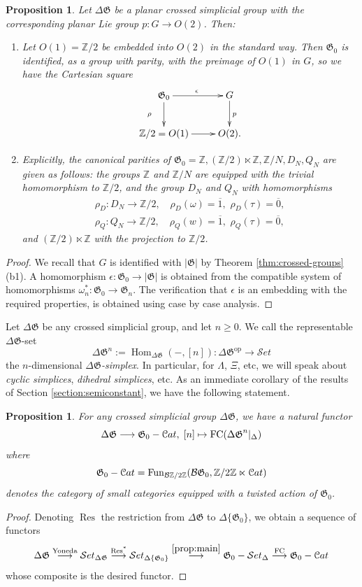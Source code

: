 \documentclass[english,11pt,leqno]{article}
\def\ZZ{\mathbb{Z}}
\def\Gen{\mathfrak{G}}
\def\Hom{\operatorname{Hom}}
\def\on{\operatorname}
\def\lra{\longrightarrow}
\def\op{{\operatorname{op}}}
\def\Fun{\operatorname{Fun}}
\def\Hom{\operatorname{Hom}}
\def\Cat{{\mathcal Cat}}
\def\Set{ {\mathcal Set}}
\def\FC{\operatorname{FC}}
\def\B{ {\EuScript B}}
\def\Set{ {\mathcal Set}}
\def\FC{\on{FC}}
\def\Zt{\mathbb{Z}/2\mathbb{Z}}
\def\BZt{{\mathcal B}\mathbb{Z}/2\mathbb{Z}}
\def\B{{\mathcal B}}
\def\Cat{{\EuScript Cat}}
\def\DG{ {\Delta \Gen}}
\newtheorem{prop}[thm]{Proposition}
\theoremstyle{definition}
\theoremstyle{remark}
\numberwithin{equation}{section}
\begin{document}
\begin{prop}\label{prop:orient-G-0}
Let $\DG$ be a planar crossed simplicial group with the corresponding planar Lie group $p: G \to O(2)$. Then:
\begin{enumerate}
\item[(a)] Let $O(1)=\ZZ/2$ be embedded into $O(2)$ in the standard way. Then $\Gen_0$ is identified,
as a group with parity, with the preimage of $O(1)$ in $G$, so we have the Cartesian square
\[
\xymatrix{
\Gen_0\ar[r]^\epsilon \ar[d]^{\hskip -.7cm \rho} & G\ar[d]^p\\
\ZZ/2=O(1) \ar[r]& O(2). 
}
\]
\item[(b)] Explicitly, the canonical parities of $\Gen_0 = \ZZ, (\ZZ/2)\ltimes \ZZ, \ZZ/N, D_N, Q_N$
are given as follows:  
 the groups  $\ZZ$ and $\ZZ/N$  are equipped with the trivial homomorphism to
 $\ZZ/2$, and the group  $D_N$ and $Q_N$ with homomorphisms
\[
 \begin{gathered}
   \rho_D: D_N\lra  \ZZ/2, \quad \rho_D(\omega)=\overline 1, \,\,\rho_D(\tau)=\overline 0, 
 \\
 \rho_Q: Q_N\lra  \ZZ/2, \quad \rho_Q(w)=\overline 1, \,\,\rho_Q(\tau)=\overline 0,
 \end{gathered}
 \]
 and $(\ZZ/2)\ltimes\ZZ$ with the projection to $\ZZ/2$. 
\end{enumerate}
\end{prop}
\begin{proof}We recall that $G$ is identified with $|\Gen|$ by Theorem 
\ref{thm:crossed-groups}(b1). A homomorphism $\epsilon: \Gen_0\to |\Gen|$
is obtained from the compatible system of homomorphisms $\omega_n^*: \Gen_0\to \Gen_n$. 
The verification that $\epsilon$ is an embedding with the required properties, is obtained using case
by case analysis.
\end{proof}

Let $\DG$ be any crossed simplicial group, and let $n\geq 0$. We call the representable $\DG$-set
\[
\DG^n := \Hom_\DG(-, [n]): \DG^\op\lra\Set
\]
the $n$-dimensional {\em $\DG$-simplex}. In particular, for $\Lambda$, $\Xi$, etc, we will speak
about {\em cyclic simplices}, {\em dihedral simplices}, etc. As an immediate corollary of the
results of Section \ref{section:semiconstant}, we have the following statement.

\begin{prop}\label{prop:cosimplex} For any crossed simplicial group $\DG$, we have a natural functor 
	\[
		\DG \lra \Gen_0-\Cat,\; [n] \mapsto \FC(\DG^n|_{\Delta})
	\]
	where 
	\[
		\Gen_0-\Cat = \Fun_{\BZt}(\B \Gen_0, \Zt \ltimes \Cat)
	\]
	denotes the category of small categories equipped with a twisted
	action of $\Gen_0$.
\end{prop}
\begin{proof}  Denoting $\on{Res}$ the restriction from $\DG$ to $\Delta\{\Gen_0\}$,  we obtain
	a sequence of functors
	\[
		\DG \overset{\text{Yoneda}}{\lra} \Set_{\DG} \overset{\on{Res^*}}{\lra}
		\Set_{\Delta \{ \Gen_0 \}} \overset{\ref{prop:main}}{\lra} \Gen_0-\Set_{\Delta}
			\overset{\FC}{\lra}
			\Gen_0-\Cat
	\]
	whose composite is the desired functor.
\end{proof}
\end{document}
